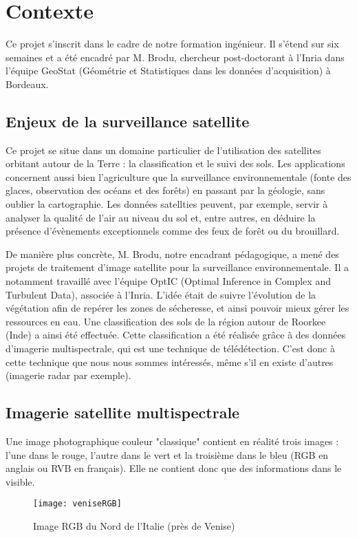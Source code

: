 
\section{Contexte}

Ce projet s'inscrit dans le cadre de notre formation ingénieur. Il s'étend sur six semaines et a été encadré par M. Brodu, chercheur post-doctorant à l'Inria dans l'équipe GeoStat (Géométrie et Statistiques dans les données d'acquisition) à Bordeaux. 

\subsection{Enjeux de la surveillance satellite}

Ce projet se situe dans un domaine particulier de l'utilisation des satellites orbitant autour de la Terre : la classification et le suivi des sols. 
Les applications concernent aussi bien l'agriculture que la surveillance environnementale (fonte des glaces, observation des océans et des forêts) en passant par la géologie, sans oublier la cartographie.
Les données satellties peuvent, par exemple, servir à analyser la qualité de l'air au niveau du sol et, entre autres, en déduire la présence d'évènements exceptionnels comme des feux de forêt ou du brouillard\cite{airSurv}. 

De manière plus concrète, M. Brodu, notre encadrant pédagogique, a mené des projets de traitement d'image satellite pour la surveillance environnementale. Il a notamment travaillé avec l'équipe OptIC (Optimal Inference in Complex and Turbulent Data), associée à l'Inria. L'idée était de suivre l'évolution de la végétation afin de repérer les zones de sécheresse, et ainsi pouvoir mieux gérer les ressources en eau. Une classification des sols de la région autour de Roorkee (Inde) a ainsi été effectuée. 
Cette classification a été réalisée grâce à des données d'imagerie multispectrale, qui est une technique de télédétection. C'est donc à cette technique que nous nous sommes intéressés, même s'il en existe d'autres (imagerie radar par exemple). 

\subsection{Imagerie satellite multispectrale}

Une image photographique couleur "classique" contient en réalité trois images : l'une dans le rouge, l'autre dans le vert et la troisième dans le bleu (RGB en anglais ou RVB en français). Elle ne contient donc que des informations dans le visible. 
\begin{figure}
  \centering
    \texttt{[image: veniseRGB]}
  \caption{Image RGB du Nord de l'Italie (près de Venise)}
  \label{fig:veniseRGB}
\end{figure}

